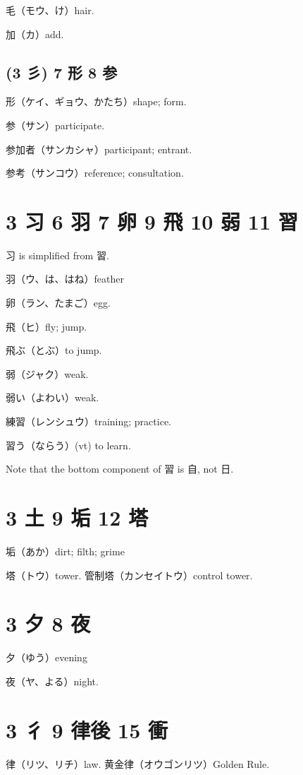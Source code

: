 毛（モウ、け）hair.

加（カ）add.

\subsection{(3 彡) 7 形 8 参}

形（ケイ、ギョウ、かたち）shape; form.

参（サン）participate.

参加者（サンカシャ）participant; entrant.

参考（サンコウ）reference; consultation.

\section{3 习 6 羽 7 卵 9 飛 10 弱 11 習}

习 is simplified from 習.

羽（ウ、は、はね）feather

卵（ラン、たまご）egg.

飛（ヒ）fly; jump.

飛ぶ（とぶ）to jump.

弱（ジャク）weak.

弱い（よわい）weak.

練習（レンシュウ）training; practice.

習う（ならう）(vt) to learn.

Note that the bottom component of 習 is 自, not 日.

\section{3 土 9 垢 12 塔}

垢（あか）dirt; filth; grime

塔（トウ）tower.
管制塔（カンセイトウ）control tower.

\section{3 夕 8 夜}

夕（ゆう）evening

夜（ヤ、よる）night.

\section{3 彳 9 律後 15 衝}

律（リツ、リチ）law.
黄金律（オウゴンリツ）Golden Rule.

